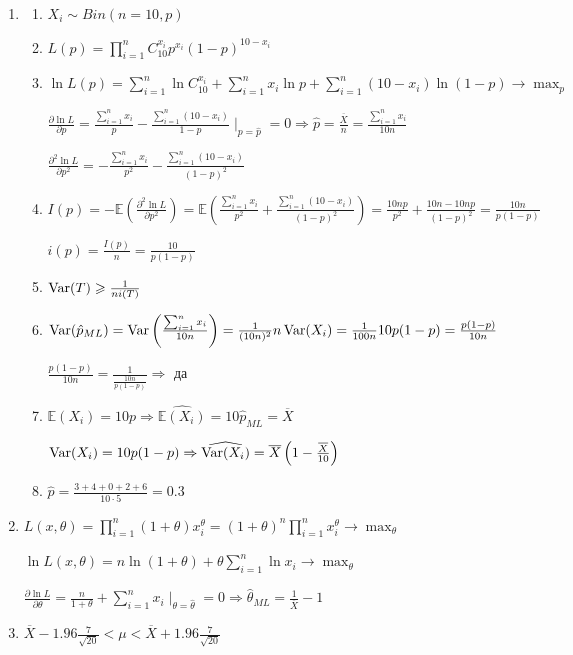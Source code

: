 \documentclass[12pt, a4paper]{article}\usepackage[]{graphicx}\usepackage[]{color}
\begin{document}
\begin{enumerate}
							\item
							\begin{enumerate}
								\item $X_i \sim Bin (n=10, p)$
								\item $L(p)  = \prod_{i=1}^{n} C_{10}^{x_i} p^{x_i} (1-p)^{10-x_i}$
								\item $\ln L(p) = \sum_{i=1}^{n} \ln C_{10}^{x_i} + \sum_{i=1}^n x_i \ln p + \sum_{i=1}^{n} (10-x_i)\ln (1-p) \to \max_p$

								$\frac{\partial \ln L}{\partial p} = \frac{\sum_{i=1}^n x_i}{p} - \frac{\sum_{i=1}^{n} (10-x_i)}{1-p} \mid_{p=\hat{p}} = 0 \Rightarrow \hat{p} = \frac{\overline{X}}{n} = \frac{\sum_{i=1}^{n} x_i}{10n}$

								$\frac{\partial^2 \ln L}{\partial p^2} = -\frac{\sum_{i=1}^n x_i}{p^2} -  \frac{\sum_{i=1}^{n} (10-x_i)}{(1-p)^2}$

								\item $I(p) = -\mathbb{E} \left(\frac{\partial^2 \ln L}{\partial p^2}  \right) = \mathbb{E} \left(\frac{\sum_{i=1}^n x_i}{p^2} + \frac{\sum_{i=1}^{n} (10-x_i)}{(1-p)^2}\right) = \frac{10np}{p^2} + \frac{10n - 10np}{(1-p)^2} = \frac{10n}{p(1-p)}$

								$i(p) = \frac{I(p)}{n} = \frac{10}{p(1-p)}$

								\item $\operatorname{Var}(T) \geqslant \frac{1}{ni(T)}$

								\item $\operatorname{Var}(\hat{p}_{ML}) = \operatorname{Var}\left(\frac{\sum_{i=1}^{n} x_i}{10n}\right) = \frac{1}{(10n)^2} n \operatorname{Var}(X_i) = \frac{1}{100n}10p(1-p) = \frac{p(1-p)}{10n}$

								$\frac{p(1-p)}{10n} = \frac{1}{\frac{10n}{p(1-p)}} \Rightarrow$ да

								\item $\mathbb{E}(X_i) = 10p \Rightarrow \widehat{\mathbb{E}(X_i)} = 10 \hat{p}_{ML} = \overline{X}$

								$\operatorname{Var}(X_i) = 10p(1-p) \Rightarrow \widehat{\operatorname{Var}(X_i)} = \overline{X}\left(1-\frac{\overline{X}}{10}\right)$

								\item $\hat{p} = \frac{3+4+0+2+6}{10\cdot 5} = 0.3$
							\end{enumerate}

							\item $L(x, \theta) = \prod_{i=1}^{n} (1 + \theta) x_i^\theta = (1+\theta)^n \prod_{i=1}^n x_i^\theta \to \max_\theta$

							$\ln L (x, \theta) = n\ln (1+\theta) + \theta\sum_{i=1}^{n} \ln x_i \to \max_\theta$

							$\frac{\partial \ln L}{\partial \theta} = \frac{n}{1+\theta} + \sum_{i=1}^{n} x_i \mid_{\theta=\hat{\theta}} = 0 \Rightarrow \hat{\theta}_{ML} = \frac{1}{\overline{X}} -1$

							\item $\overline{X} - 1.96 \frac{7}{\sqrt{20}} < \mu <\overline{X} + 1.96 \frac{7}{\sqrt{20}} $
						\end{enumerate}
\end{document}
